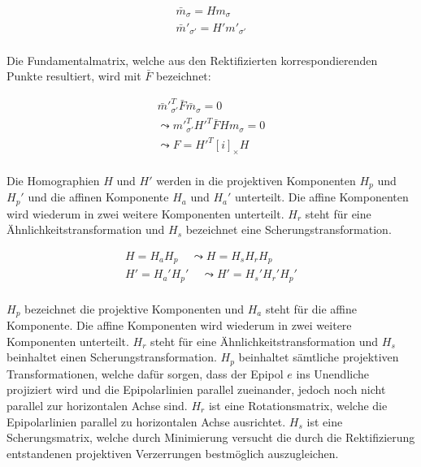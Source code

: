 
\begin{gather}
	\bar{m}_\sigma= H m_\sigma\\ \label{eq:rectifyPoints}
	\bar{m}'_{\sigma'}= H'm'_{\sigma'}
\end{gather}\\ 


Die Fundamentalmatrix, welche aus den Rektifizierten korrespondierenden Punkte resultiert, wird mit $\bar{F}$ bezeichnet\cite{ZZ,phdextrinsicPara}:


\begin{gather}
	\bar{m}'^T_{\sigma'}\bar{F}\bar{m}_\sigma = 0\\
	\leadsto m'^T_{\sigma'}H'^T\bar{F}Hm_\sigma=0\\	
	\leadsto F = H'^T[i]_\times H	
\end{gather}\\


Die Homographien $H$ und $H'$ werden in die projektiven Komponenten $H_p$ und $H_p'$ und die affinen Komponente $H_a$ und $H_a'$ unterteilt. Die affine Komponenten wird wiederum in zwei weitere Komponenten unterteilt. $H_r$ steht für eine Ähnlichkeitstransformation und $H_s$ bezeichnet eine Scherungstransformation\cite{ZZ,phdextrinsicPara}.


\begin{gather}
	H = H_a H_p  \;\;\;\; \leadsto	H = H_s H_r H_p \\
	H' = H_a'H_p'\;\;\;\; \leadsto 	H' = H_s'H_r' H_p'\\
\end{gather}


$H_p$ bezeichnet die projektive Komponenten und $H_a$ steht für die affine Komponente. Die affine Komponenten wird wiederum in zwei weitere Komponenten unterteilt. $H_r$ steht für eine Ähnlichkeitstransformation und $H_s$ beinhaltet einen Scherungstransformation. $H_p$ beinhaltet sämtliche projektiven Transformationen, welche dafür sorgen, dass der Epipol $e$ ins Unendliche projiziert wird und die Epipolarlinien parallel zueinander, jedoch noch nicht parallel zur horizontalen Achse sind\cite{ZZ,phdextrinsicPara}. $H_r$ ist eine Rotationsmatrix, welche die Epipolarlinien parallel zu horizontalen Achse ausrichtet. $H_s$ ist eine Scherungsmatrix, welche durch Minimierung versucht die durch die Rektifizierung entstandenen projektiven Verzerrungen bestmöglich auszugleichen\cite{ZZ,phdextrinsicPara}. \\

